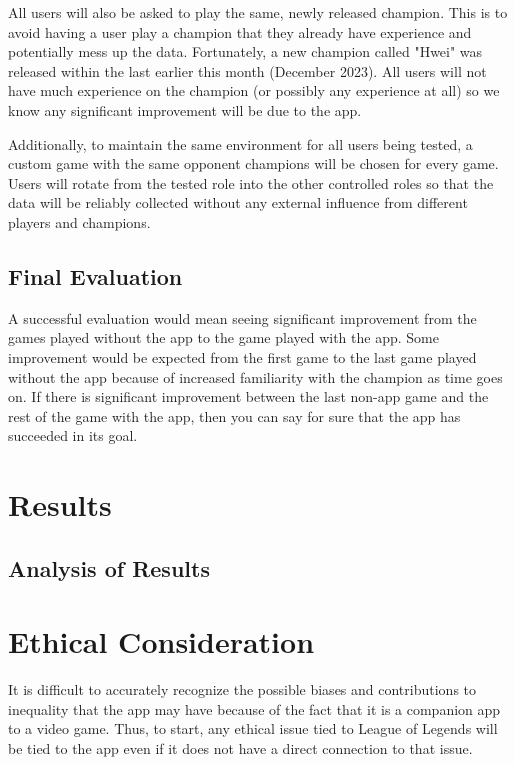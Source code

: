 \documentclass[10pt,twocolumn]{article}
\begin{document}
All users will also be asked to play the same, newly released champion.
This is to avoid having a user play a champion that they already have experience and potentially mess up the data.
Fortunately, a new champion called "Hwei" was released within the last earlier this month (December 2023).
All users will not have much experience on the champion (or possibly any experience at all) so we know any significant improvement will be due to the app.

Additionally, to maintain the same environment for all users being tested, a custom game with the same opponent champions will be chosen for every game.
Users will rotate from the tested role into the other controlled roles so that the data will be reliably collected without any external influence from different players and champions.

\subsection{Final Evaluation}
A successful evaluation would mean seeing significant improvement from the games played without the app to the game played with the app.
Some improvement would be expected from the first game to the last game played without the app because of increased familiarity with the champion as time goes on.
If there is significant improvement between the last non-app game and the rest of the game with the app, then you can say for sure that the app has succeeded in its goal.

\section{Results}

\subsection{Analysis of Results}

\section{Ethical Consideration}
It is difficult to accurately recognize the possible biases and contributions to inequality that the app may have because of the fact that it is a companion app to a video game.
Thus, to start, any ethical issue tied to League of Legends will be tied to the app even if it does not have a direct connection to that issue.
\end{document}
